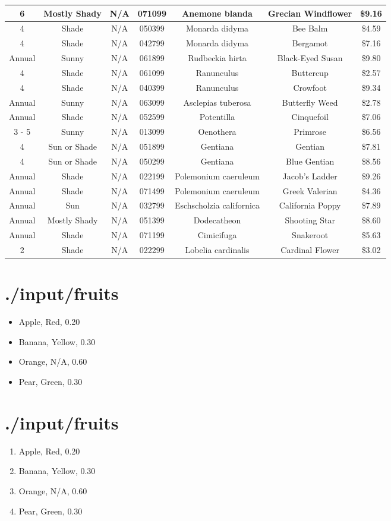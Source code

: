\documentclass{article}
\begin{document}
\begin{center}
\begin{tabular}{|c|c|c|c|c|c|c|}
6 & Mostly Shady & N/A & 071099 & Anemone blanda & Grecian Windflower & \$9.16\\ \hline
4 & Shade & N/A & 050399 & Monarda didyma & Bee Balm & \$4.59\\ \hline
4 & Shade & N/A & 042799 & Monarda didyma & Bergamot & \$7.16\\ \hline
Annual & Sunny & N/A & 061899 & Rudbeckia hirta & Black-Eyed Susan & \$9.80\\ \hline
4 & Shade & N/A & 061099 & Ranunculus & Buttercup & \$2.57\\ \hline
4 & Shade & N/A & 040399 & Ranunculus & Crowfoot & \$9.34\\ \hline
Annual & Sunny & N/A & 063099 & Asclepias tuberosa & Butterfly Weed & \$2.78\\ \hline
Annual & Shade & N/A & 052599 & Potentilla & Cinquefoil & \$7.06\\ \hline
3 - 5 & Sunny & N/A & 013099 & Oenothera & Primrose & \$6.56\\ \hline
4 & Sun or Shade & N/A & 051899 & Gentiana & Gentian & \$7.81\\ \hline
4 & Sun or Shade & N/A & 050299 & Gentiana & Blue Gentian & \$8.56\\ \hline
Annual & Shade & N/A & 022199 & Polemonium caeruleum & Jacob's Ladder & \$9.26\\ \hline
Annual & Shade & N/A & 071499 & Polemonium caeruleum & Greek Valerian & \$4.36\\ \hline
Annual & Sun & N/A & 032799 & Eschscholzia californica & California Poppy & \$7.89\\ \hline
Annual & Mostly Shady & N/A & 051399 & Dodecatheon & Shooting Star & \$8.60\\ \hline
Annual & Shade & N/A & 071199 & Cimicifuga & Snakeroot & \$5.63\\ \hline
2 & Shade & N/A & 022299 & Lobelia cardinalis & Cardinal Flower & \$3.02\\ \hline
\end{tabular}
\vspace{1cm}
\section*{./input/fruits}
\begin{itemize}
\item Apple, Red, 0.20
\item Banana, Yellow, 0.30
\item Orange, N/A, 0.60
\item Pear, Green, 0.30
\end{itemize}
\vspace{1cm}
\section*{./input/fruits}
\begin{enumerate}
\item Apple, Red, 0.20
\item Banana, Yellow, 0.30
\item Orange, N/A, 0.60
\item Pear, Green, 0.30
\end{enumerate}
\vspace{1cm}
\end{center}
\end{document}
